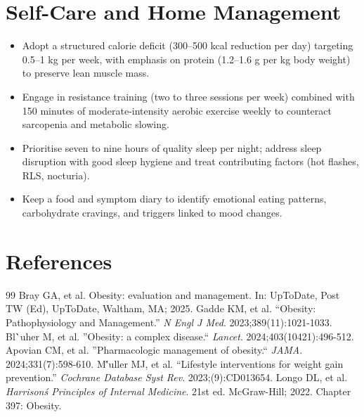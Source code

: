 \section*{Self-Care and Home Management}
\begin{itemize}
  \item Adopt a structured calorie deficit (300--500 kcal reduction per day) targeting 0.5--1 kg per week, with emphasis on protein (1.2--1.6 g per kg body weight) to preserve lean muscle mass.
  \item Engage in resistance training (two to three sessions per week) combined with 150 minutes of moderate-intensity aerobic exercise weekly to counteract sarcopenia and metabolic slowing.
  \item Prioritise seven to nine hours of quality sleep per night; address sleep disruption with good sleep hygiene and treat contributing factors (hot flashes, RLS, nocturia).
  \item Keep a food and symptom diary to identify emotional eating patterns, carbohydrate cravings, and triggers linked to mood changes.
\end{itemize}

\section*{References}
\begin{thebibliography}{99}
 Bray GA, et al. Obesity: evaluation and management. In: UpToDate, Post TW (Ed), UpToDate, Waltham, MA; 2025.
 Gadde KM, et al. ``Obesity: Pathophysiology and Management.'' \emph{N Engl J Med}. 2023;389(11):1021-1033.
 Bl\``uher M, et al. ''Obesity: a complex disease.`` \emph{Lancet}. 2024;403(10421):496-512.
 Apovian CM, et al. ''Pharmacologic management of obesity.`` \emph{JAMA}. 2024;331(7):598-610.
 M\''uller MJ, et al. ``Lifestyle interventions for weight gain prevention.'' \emph{Cochrane Database Syst Rev}. 2023;(9):CD013654.
 Longo DL, et al. \emph{Harrison\'s Principles of Internal Medicine}. 21st ed. McGraw-Hill; 2022. Chapter 397: Obesity.
\end{thebibliography}
